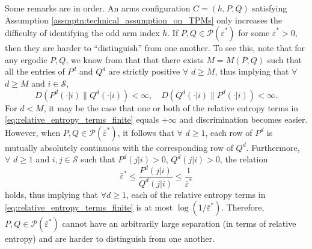 Some remarks are in order. An arms configuration $C=(h, P, Q)$ satisfying Assumption \ref{assmptn:technical_assumption_on_TPMs}
only increases the difficulty of identifying the odd arm index $h$. If $P, Q\in \mathscr{P}(\bar{\varepsilon}^*)$ for some $\bar{\varepsilon}^*>0$, then they are harder to ``distinguish'' from one another. To see this, note that for any ergodic $P, Q$, we know from \cite[Proposition 2.4]{levin2017markov} that that there exists $M=M(P, Q)$ such that all the entries of $P^d$ and $Q^d$ are strictly positive $\forall$ $d\geq M$, thus implying that $\forall$ $d\geq M$ and $i \in \mathcal{S}$,
\begin{equation}
	D(P^d(\cdot|i)\|Q^d(\cdot|i))<\infty,\quad D(Q^d(\cdot|i)\|P^d(\cdot|i))<\infty.
	\label{eq:relative_entropy_terms_finite}
\end{equation}
For $d<M$, it may be the case that one or both of the relative entropy terms in \eqref{eq:relative_entropy_terms_finite} equals $+\infty$ and discrimination becomes easier. However, when $P, Q\in \mathscr{P}(\bar{\varepsilon}^*)$, it follows that $\forall$ $d\geq 1$, each row of $P^d$ is mutually absolutely continuous with the corresponding row of $Q^d$. Furthermore, $\forall$ $d\geq 1$ and $i,j \in \mathcal{S}$ such that $P^d(j|i)>0$, $Q^d(j|i)>0$, the relation
\begin{equation}
	\bar{\varepsilon}^* \leq \frac{P^d(j|i)}{Q^d(j|i)}\leq  \frac{1}{\bar{\varepsilon}^*}
	\label{eq:a_desired_relation}
\end{equation}
holds, thus implying that $\forall d\geq 1$, each of the relative entropy terms in \eqref{eq:relative_entropy_terms_finite} is at most $\log (1/\bar{\varepsilon}^*)$. Therefore, $P, Q\in  \mathscr{P}(\bar{\varepsilon}^*)$ cannot have an arbitrarily large separation (in terms of relative entropy) and are harder to distinguish from one another.

